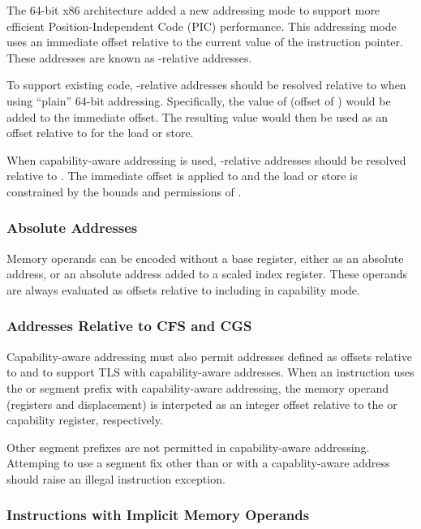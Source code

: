 The 64-bit x86 architecture added a new addressing mode to support more
efficient Position-Independent Code (PIC) performance.
This addressing mode uses an immediate offset
relative to the current value of the instruction
pointer.  These addresses are known as \RIP{}-relative addresses.

To support existing code, \RIP{}-relative addresses should be resolved
relative to \DDC{} when using ``plain'' 64-bit addressing.
Specifically, the value of \RIP{} (offset of \CIP{}) would be added to
the immediate offset.  The resulting value would then be used as an
offset relative to \DDC{} for the load or store.

When capability-aware addressing is used, \RIP{}-relative addresses
should be resolved relative to \CIP{}.
The immediate offset is applied to \CIP{} and the load
or store is constrained by the bounds and permissions of \CIP{}.

\subsubsection{Absolute Addresses}

Memory operands can be encoded without a base register, either as an
absolute address, or an absolute address added to a scaled index
register.  These operands are always evaluated as offsets relative to
\DDC{} including in capability mode.

\subsubsection{Addresses Relative to CFS and CGS}

Capability-aware addressing must also permit addresses defined as
offsets relative to \CFS{} and \CGS{} to support TLS with
capability-aware addresses.  When an instruction uses the \FS{} or
\GS{} segment prefix with capability-aware addressing, the memory
operand (registers and displacement) is interpeted as an integer
offset relative to the \CFS{} or \CGS{} capability register,
respectively.

Other segment prefixes are not permitted in capability-aware
addressing.  Attemping to use a segment fix other than \FS{} or
\GS{} with a capablity-aware address should raise an illegal
instruction exception.

\subsubsection{Instructions with Implicit Memory Operands}

